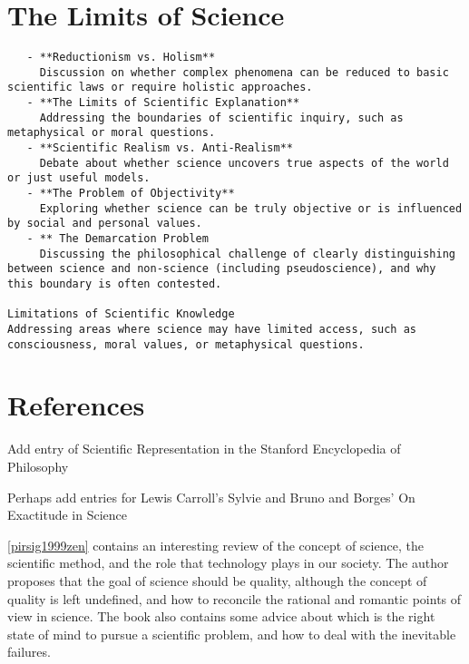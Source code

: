 %
% 

\section{The Limits of Science}

\begin{verbatim}
   - **Reductionism vs. Holism**  
     Discussion on whether complex phenomena can be reduced to basic scientific laws or require holistic approaches.
   - **The Limits of Scientific Explanation**  
     Addressing the boundaries of scientific inquiry, such as metaphysical or moral questions.
   - **Scientific Realism vs. Anti-Realism**  
     Debate about whether science uncovers true aspects of the world or just useful models.
   - **The Problem of Objectivity**  
     Exploring whether science can be truly objective or is influenced by social and personal values.
   - ** The Demarcation Problem
     Discussing the philosophical challenge of clearly distinguishing between science and non-science (including pseudoscience), and why this boundary is often contested.

Limitations of Scientific Knowledge
Addressing areas where science may have limited access, such as consciousness, moral values, or metaphysical questions.

\end{verbatim}


%
%

\section*{References}

{\color{red} Add entry of Scientific Representation in the Stanford Encyclopedia of Philosophy}

{\color{red} Perhaps add entries for Lewis Carroll's Sylvie and Bruno and Borges' On Exactitude in Science}

\ref{pirsig1999zen} contains an interesting review of the concept of science, the scientific method, and the role that technology plays in our society. The author proposes that the goal of science should be quality, although the concept of quality is left undefined, and how to reconcile the rational and romantic points of view in science. The book also contains some advice about which is the right state of mind to pursue a scientific problem, and how to deal with the inevitable failures.



